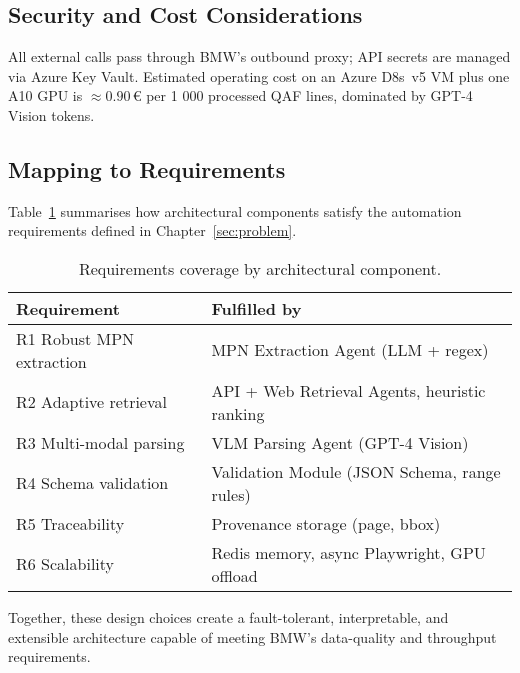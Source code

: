 \subsection{Security and Cost Considerations}
All external calls pass through BMW’s outbound proxy; API secrets are managed via Azure Key Vault.  
Estimated operating cost on an Azure D8s~v5 VM plus one A10 GPU is \(\approx 0.90\,€\) per 1 000 processed QAF lines, dominated by GPT-4 Vision tokens.

\subsection{Mapping to Requirements}
Table~\ref{tab:reqmap} summarises how architectural components satisfy the automation requirements defined in Chapter~\ref{sec:problem}.

\begin{table}[ht]
  \centering
  \caption{Requirements coverage by architectural component.}
  \label{tab:reqmap}
  \begin{tabular}{ll}
    \hline
    Requirement & Fulfilled by \\\hline
    R1 Robust MPN extraction & MPN Extraction Agent (LLM + regex) \\
    R2 Adaptive retrieval    & API + Web Retrieval Agents, heuristic ranking \\
    R3 Multi-modal parsing   & VLM Parsing Agent (GPT-4 Vision) \\
    R4 Schema validation     & Validation Module (JSON Schema, range rules) \\
    R5 Traceability          & Provenance storage (page, bbox) \\
    R6 Scalability           & Redis memory, async Playwright, GPU offload \\\hline
  \end{tabular}
\end{table}

Together, these design choices create a fault-tolerant, interpretable, and extensible architecture capable of meeting BMW’s data-quality and throughput requirements.
